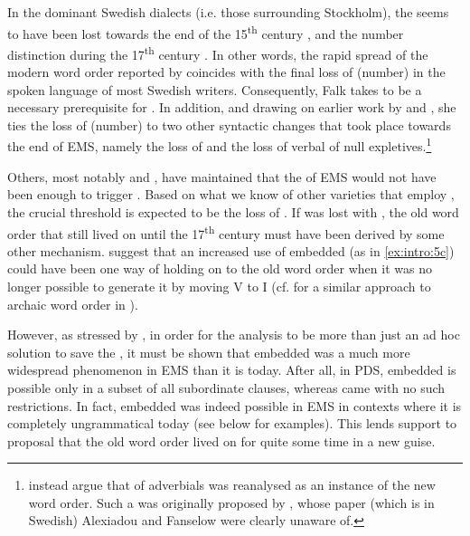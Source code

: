 \documentclass[output=paper]{langscibook}
\begin{document}
In the dominant Swedish dialects (i.e. those surrounding Stockholm), the  seems to have been lost towards the end of the 15\textsuperscript{th} century \citep{Neuman1925}, and the number distinction during the 17\textsuperscript{th} century \citep{Larsson1988}. In other words, the rapid spread of the modern word order reported by \citet{Falk1993} coincides with the final loss of (number)  in the spoken language of most Swedish writers. Consequently, Falk takes  to be a necessary prerequisite for  . In addition, and drawing on earlier work by \citet{Platzack1985} and \citet{PlatzackHolmberg1989}, she ties the loss of (number)  to two other syntactic changes that took place towards the end of EMS, namely the loss of  and the loss of verbal  of null expletives.\footnote{\citet{AlexiadouFanselow2002} instead argue that  of adverbials was reanalysed as an instance of the new word order. Such a  was originally proposed by \citet{Pettersson1988}, whose paper (which is in Swedish) Alexiadou and Fanselow were clearly unaware of.} 



Others, most notably \citet{Rohrbacher1999} and \citet{KoenemanZeijlstra2014}, have maintained that the  of EMS would not have been enough to trigger . Based on what we know of other varieties that employ , the crucial threshold is expected to be the loss of . If  was lost with , the old word order that still lived on until the 17\textsuperscript{th} century must have been derived by some other mechanism. \citet{KoenemanZeijlstra2014} suggest that an increased use of embedded  (as in \ref{ex:intro:5c}) could have been one way of holding on to the old word order when it was no longer possible to generate it by moving V to I (cf. \citealt{HeycockEtAl2010} for a similar approach to archaic word order in ).



However, as stressed by \citet{Gartner2019}, in order for the  analysis to be more than just an ad hoc solution to save the , it must be shown that embedded  was a much more widespread phenomenon in EMS than it is today. After all, in PDS, embedded  is possible only in a subset of all subordinate clauses, whereas  came with no such restrictions. In fact, embedded  was indeed possible in EMS in contexts where it is completely ungrammatical today (see  below for examples). This lends support to  proposal that the old word order lived on for quite some time in a new guise.
\end{document}
